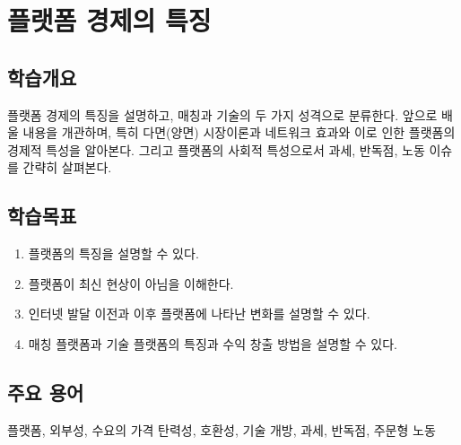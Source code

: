 \chapter{플랫폼 경제의 특징}\label{cha:whatisplatform}

\section*{학습개요}
플랫폼 경제의 특징을 설명하고, 매칭과 기술의 두 가지 성격으로 분류한다. 앞으로 배울 내용을 개관하며, 특히 다면(양면) 시장이론과 네트워크 효과와 이로 인한 플랫폼의 경제적 특성을 알아본다. 그리고 플랫폼의 사회적 특성으로서 과세, 반독점, 노동 이슈를 간략히 살펴본다.


\section*{학습목표}
\begin{enumerate}
\item 플랫폼의 특징을 설명할 수 있다.
\item 플랫폼이 최신 현상이 아님을 이해한다.
\item 인터넷 발달 이전과 이후 플랫폼에 나타난 변화를 설명할 수 있다.
\item 매칭 플랫폼과 기술 플랫폼의 특징과 수익 창출 방법을 설명할 수 있다.
\end{enumerate}

\section*{주요 용어}
플랫폼, 외부성, 수요의 가격 탄력성, 호환성, 기술 개방, 과세, 반독점, 주문형 노동


\pagebreak

